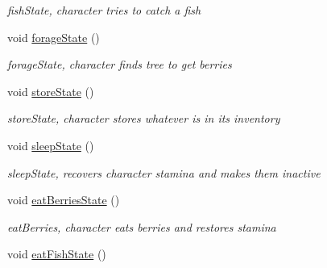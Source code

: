 \begin{DoxyCompactItemize}
\begin{DoxyCompactList}\small\item\em fish\+State, character tries to catch a fish \end{DoxyCompactList}\item 
\hypertarget{class_character_a2702b884d9cb8e0e8d345c97adc7e76a}{}void \hyperlink{class_character_a2702b884d9cb8e0e8d345c97adc7e76a}{forage\+State} ()\label{class_character_a2702b884d9cb8e0e8d345c97adc7e76a}

\begin{DoxyCompactList}\small\item\em forage\+State, character finds tree to get berries \end{DoxyCompactList}\item 
\hypertarget{class_character_a4f4a237ebbb9ddbb67a2eac4043f0079}{}void \hyperlink{class_character_a4f4a237ebbb9ddbb67a2eac4043f0079}{store\+State} ()\label{class_character_a4f4a237ebbb9ddbb67a2eac4043f0079}

\begin{DoxyCompactList}\small\item\em store\+State, character stores whatever is in its inventory \end{DoxyCompactList}\item 
\hypertarget{class_character_a89e4341dc66ca4bab4421c812dea8b13}{}void \hyperlink{class_character_a89e4341dc66ca4bab4421c812dea8b13}{sleep\+State} ()\label{class_character_a89e4341dc66ca4bab4421c812dea8b13}

\begin{DoxyCompactList}\small\item\em sleep\+State, recovers character stamina and makes them inactive \end{DoxyCompactList}\item 
\hypertarget{class_character_a908d0220138b9d0be3cd5f091da69e1f}{}void \hyperlink{class_character_a908d0220138b9d0be3cd5f091da69e1f}{eat\+Berries\+State} ()\label{class_character_a908d0220138b9d0be3cd5f091da69e1f}

\begin{DoxyCompactList}\small\item\em eat\+Berries, character eats berries and restores stamina \end{DoxyCompactList}\item 
\hypertarget{class_character_a52dc1916690a26dc1693c22c98a609e8}{}void \hyperlink{class_character_a52dc1916690a26dc1693c22c98a609e8}{eat\+Fish\+State} ()\label{class_character_a52dc1916690a26dc1693c22c98a609e8}


\end{DoxyCompactItemize}
